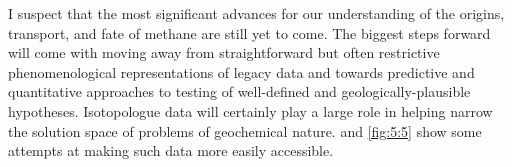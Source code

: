 I suspect that the most significant advances for our understanding of
the origins, transport, and fate of methane are still yet to come. The
biggest steps forward will come with moving away from straightforward
but often restrictive phenomenological representations of legacy data
and towards predictive and quantitative approaches to testing of
well-defined and geologically-plausible hypotheses. Isotopologue data
will certainly play a large role in helping narrow the solution space of
problems of geochemical nature.  and \ref{fig:5:5} show some attempts at
making such data more easily accessible.







